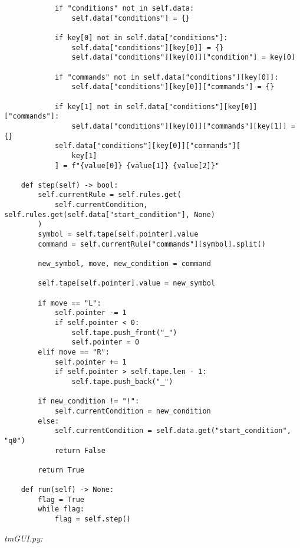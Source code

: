 \begin{lstlisting}
            if "conditions" not in self.data:
                self.data["conditions"] = {}

            if key[0] not in self.data["conditions"]:
                self.data["conditions"][key[0]] = {}
                self.data["conditions"][key[0]]["condition"] = key[0]

            if "commands" not in self.data["conditions"][key[0]]:
                self.data["conditions"][key[0]]["commands"] = {}

            if key[1] not in self.data["conditions"][key[0]]["commands"]:
                self.data["conditions"][key[0]]["commands"][key[1]] = {}
            self.data["conditions"][key[0]]["commands"][
                key[1]
            ] = f"{value[0]} {value[1]} {value[2]}"

    def step(self) -> bool:
        self.currentRule = self.rules.get(
            self.currentCondition, self.rules.get(self.data["start_condition"], None)
        )
        symbol = self.tape[self.pointer].value
        command = self.currentRule["commands"][symbol].split()

        new_symbol, move, new_condition = command

        self.tape[self.pointer].value = new_symbol

        if move == "L":
            self.pointer -= 1
            if self.pointer < 0:
                self.tape.push_front("_")
                self.pointer = 0
        elif move == "R":
            self.pointer += 1
            if self.pointer > self.tape.len - 1:
                self.tape.push_back("_")

        if new_condition != "!":
            self.currentCondition = new_condition
        else:
            self.currentCondition = self.data.get("start_condition", "q0")
            return False

        return True

    def run(self) -> None:
        flag = True
        while flag:
            flag = self.step()
\end{lstlisting}


\hypertarget{word:tmGUI}{\textit{tmGUI.py:}}


